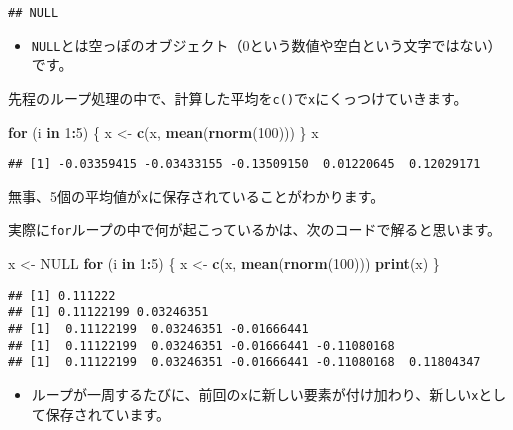 \documentclass[]{bxjsarticle}
\newenvironment{Shaded}{\begin{snugshade}}{\end{snugshade}}
\newcommand{\ControlFlowTok}[1]{\textcolor[rgb]{0.13,0.29,0.53}{\textbf{#1}}}
\newcommand{\DecValTok}[1]{\textcolor[rgb]{0.00,0.00,0.81}{#1}}
\newcommand{\KeywordTok}[1]{\textcolor[rgb]{0.13,0.29,0.53}{\textbf{#1}}}
\newcommand{\NormalTok}[1]{#1}
\newcommand{\OperatorTok}[1]{\textcolor[rgb]{0.81,0.36,0.00}{\textbf{#1}}}
\newcommand{\OtherTok}[1]{\textcolor[rgb]{0.56,0.35,0.01}{#1}}
\newcommand{\StringTok}[1]{\textcolor[rgb]{0.31,0.60,0.02}{#1}}
\providecommand{\tightlist}{%
  \setlength{\itemsep}{0pt}\setlength{\parskip}{0pt}}
\begin{document}
\begin{verbatim}
## NULL
\end{verbatim}

\begin{itemize}
\tightlist
\item
  \texttt{NULL}とは空っぽのオブジェクト（0という数値や空白という文字ではない）です。
\end{itemize}

先程のループ処理の中で、計算した平均を\texttt{c()}で\texttt{x}にくっつけていきます。

\begin{Shaded}
\begin{Highlighting}[]
\ControlFlowTok{for}\NormalTok{ (i }\ControlFlowTok{in} \DecValTok{1}\OperatorTok{:}\DecValTok{5}\NormalTok{) \{}
\NormalTok{  x <-}\StringTok{ }\KeywordTok{c}\NormalTok{(x, }\KeywordTok{mean}\NormalTok{(}\KeywordTok{rnorm}\NormalTok{(}\DecValTok{100}\NormalTok{)))}
\NormalTok{\}}
\NormalTok{x}
\end{Highlighting}
\end{Shaded}

\begin{verbatim}
## [1] -0.03359415 -0.03433155 -0.13509150  0.01220645  0.12029171
\end{verbatim}

無事、5個の平均値が\texttt{x}に保存されていることがわかります。

実際に\texttt{for}ループの中で何が起こっているかは、次のコードで解ると思います。

\begin{Shaded}
\begin{Highlighting}[]
\NormalTok{x <-}\StringTok{ }\OtherTok{NULL}
\ControlFlowTok{for}\NormalTok{ (i }\ControlFlowTok{in} \DecValTok{1}\OperatorTok{:}\DecValTok{5}\NormalTok{) \{}
\NormalTok{  x <-}\StringTok{ }\KeywordTok{c}\NormalTok{(x, }\KeywordTok{mean}\NormalTok{(}\KeywordTok{rnorm}\NormalTok{(}\DecValTok{100}\NormalTok{)))}
  \KeywordTok{print}\NormalTok{(x)}
\NormalTok{\}}
\end{Highlighting}
\end{Shaded}

\begin{verbatim}
## [1] 0.111222
## [1] 0.11122199 0.03246351
## [1]  0.11122199  0.03246351 -0.01666441
## [1]  0.11122199  0.03246351 -0.01666441 -0.11080168
## [1]  0.11122199  0.03246351 -0.01666441 -0.11080168  0.11804347
\end{verbatim}

\begin{itemize}
\tightlist
\item
  ループが一周するたびに、前回の\texttt{x}に新しい要素が付け加わり、新しい\texttt{x}として保存されています。
\end{itemize}
\end{document}
